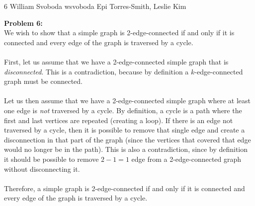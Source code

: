 \documentclass[12pt,letterpaper]{cos340hw}
\begin{document}
           {6}            %
           {William Svoboda}  %
           {wsvoboda}   %
           {Epi Torres-Smith, Leslie Kim} 




\noindent\textbf{Problem 6:}\\
We wish to show that a simple graph is 2-edge-connected if and only if it is connected and every edge 
of the graph is traversed by a cycle.\\\\
First, let us assume that we have a 2-edge-connected simple graph that is \emph{disconnected}. This 
is a contradiction, because by definition a $k$-edge-connected graph must be connected.\\\\
Let us then assume that we have a 2-edge-connected simple graph where at least one edge is 
\emph{not} traversed by a cycle. By definition, a cycle is a path where the first and last vertices are 
repeated (creating a loop). If there is an edge not traversed by a cycle, then it is possible to remove 
that single edge and create a disconnection in that part of the graph (since the vertices that covered 
that edge would no longer be in the path). This is also a contradiction, since by definition it should be 
possible to remove $2-1=1$ edge from a 2-edge-connected graph without disconnecting it.\\\\
Therefore, a simple graph is 2-edge-connected if and only if it is connected and every edge 
of the graph is traversed by a cycle.

\end{document}
